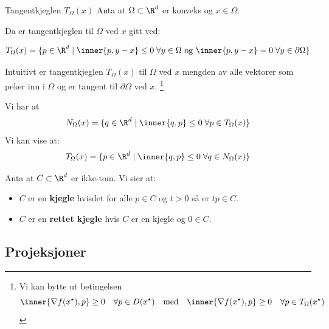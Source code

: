 \begin{definition}{Tangentkjeglen \(T_\Omega(x)\)}{}
	Anta at \(\Omega \subset \R^d\) er konveks og \(x \in \Omega\).

	Da er tangentkjeglen til \(\Omega\) ved \(x\) gitt ved:

	\[
		T_\Omega(x) = \{p \in \R^d \mid \inner{p, y - x} \leq 0 \; \forall y \in \Omega \text{ og } \inner{p, y - x} = 0 \; \forall y \in \partial \Omega\}
	\]

	Intuitivt er tangentkjeglen \(T_\Omega(x)\) til \(\Omega\) ved \(x\) mengden av alle vektorer som peker inn i \(\Omega\) og er tangent til \(\partial \Omega\) ved \(x\).
	\footnote{
		Vi kan bytte ut betingelsen
		\[
			\inner{\nabla f(x^\star), p} \geq 0 \quad \forall p \in D(x^\star) \quad \text{med} \quad \inner{\nabla f(x^\star), p} \geq 0 \quad \forall p \in T_\Omega(x^\star)
		\]
	}
\end{definition}

\begin{remark}{}{}
	Vi har at
	\[
		N_\Omega(x) = \{q \in \R^d \mid \inner{q, p} \leq 0 \; \forall p \in T_\Omega(x)\}
	\]
	Vi kan vise at:
	\begin{align*}
		T_\Omega(x) & = \{p \in \R^d \mid \inner{q, p} \leq 0 \; \forall q \in N_\Omega(x)\} \\
	\end{align*}
\end{remark}

\begin{remark}{}{}
	Anta at \(C \subset \R^d\) er ikke-tom.
	Vi sier at:
	\begin{itemize}
		\item \(C\) er en \textbf{kjegle} hvisdet for alle \(p \in C\) og \(t > 0\) så er \(t p \in C\).
		\item \(C\) er en \textbf{rettet kjegle} hvis \(C\) er en kjegle og \(0 \in C\).
	\end{itemize}
\end{remark}

\subsection*{Projeksjoner}

